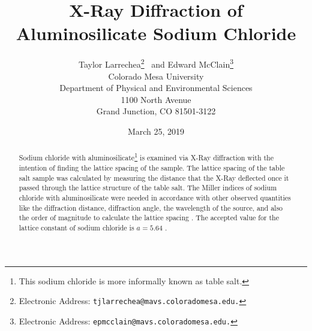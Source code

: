 \documentclass[twocolumn]{article}
\title{\textbf{X-Ray Diffraction of Aluminosilicate Sodium Chloride}}
\author{Taylor Larrechea\footnote{Electronic Address: \texttt{tjlarrechea@mavs.coloradomesa.edu.}} \ and Edward McClain\footnote{Electronic Address: \texttt{epmcclain@mavs.coloradomesa.edu.}} \\
    Colorado Mesa University \\
    Department of Physical and Environmental Sciences \\
    1100 North Avenue \\
    Grand Junction, CO 81501-3122}
\date{March 25, 2019}
\begin{document}
\maketitle
\begin{abstract}
Sodium chloride with aluminosilicate\footnote{This sodium chloride is more informally known as table salt.} is examined via X-Ray diffraction with the intention of finding the lattice spacing of the sample. The lattice spacing of the table salt sample was calculated by measuring the distance that the X-Ray deflected once it passed through the lattice structure of the table salt. The Miller indices of sodium chloride with aluminosilicate were needed in accordance with other observed quantities like the diffraction distance, diffraction angle, the wavelength of the source, and also the order of magnitude to calculate the lattice spacing \cite{WikiCrystal}. The accepted value for the lattice constant of sodium chloride is $a=5.64$ \cite{WikiLattice}.
\end{abstract}
\end{document}
